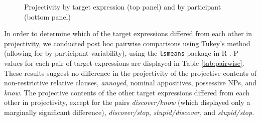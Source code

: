 \documentclass[11pt,fleqn]{article}
\newcommand{\6}{\mbox{$[\hspace*{-.6mm}[$}}
\newcommand{\9}{\mbox{$]\hspace*{-.6mm}]$}}
\newcommand{\tableref}[1]{Table \ref{#1}}
\begin{document}
\begin{figure}[!h]
\centering


	

\caption{Projectivity by target expression (top panel) and by participant (bottom panel)}
\label{fig:f-proj-1a}
\end{figure}

In order to determine which of the target expressions differed from each other in projectivity, we conducted post hoc pairwise comparisons using Tukey's method (allowing for by-participant variability), using the \verb|lsmeans| package \citep{tukey} in R \citep{r}. P-values for each pair of target expressions are displayed in \tableref{tab:pairwise}. These results suggest no difference in the projectivity of the projective contents of non-restrictive relative clauses, \emph{annoyed}, nominal appositives, possessive NPs, and \emph{know}. The projective contents of the other target expressions differed from each other in projectivity, except for the pairs \emph{discover/know} (which displayed only a marginally significant difference), \emph{discover/stop}, \emph{stupid/discover}, and \emph{stupid/stop}. 
\end{document}
